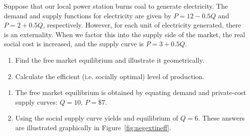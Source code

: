 \begin{enumialphparenastyle}
\begin{ex}\label{ex:ch5ex7}
Suppose that our local power station burns coal to generate electricity. The demand and supply functions for electricity are given by $P=12-0.5Q$ and $P=2+0.5Q$, respectively. However, for each unit of electricity generated, there is an externality. When we factor this into the supply side of the market, the real social cost is increased, and the supply curve is $P=3+0.5Q$.
\begin{enumerate}
	\item	Find the free market equilibrium and illustrate it geometrically.
	\item	Calculate the efficient (i.e. socially optimal) level of production.
\end{enumerate}
\begin{sol}
\begin{enumerate}
	\item	The free market equilibrium is obtained by equating demand and private-cost supply curves: $Q=10$, $P=\$7$.
	\item	Using the social supply curve yields and equilibrium of $Q=6$. These answers are illustrated graphically in Figure~\ref{fig:negextineff}.
\end{enumerate}
\end{sol}
\end{ex}


\end{enumialphparenastyle}
